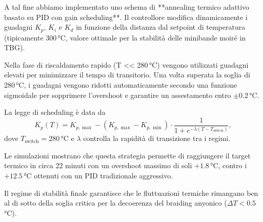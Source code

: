 \documentclass[11pt,a4paper]{article}
\theoremstyle{plain}
\theoremstyle{definition}
\begin{document}
\vspace{0.3cm}

A tal fine abbiamo implementato uno schema di **annealing termico adattivo basato su PID con gain scheduling**. Il controllore modifica dinamicamente i guadagni $K_p$, $K_i$ e $K_d$ in funzione della distanza dal setpoint di temperatura (tipicamente 300\,°C, valore ottimale per la stabilità delle minibande moiré in TBG). 

\vspace{0.3cm}

Nella fase di riscaldamento rapido (T << 280\,°C) vengono utilizzati guadagni elevati per minimizzare il tempo di transitorio. Una volta superata la soglia di 280\,°C, i guadagni vengono ridotti automaticamente secondo una funzione sigmoidale per sopprimere l'overshoot e garantire un assestamento entro $\pm 0.2$\,°C. 

\vspace{0.2cm}


La legge di scheduling è data da
\begin{equation}
K_p(T) = K_{p,\max} - (K_{p,\max} - K_{p,\min}) \cdot \frac{1}{1 + e^{-\lambda (T - T_{\text{switch}})}},
\label{eq:gain_scheduling}
\end{equation}
dove $T_{\text{switch}} = 280$\,°C e $\lambda$ controlla la rapidità di transizione tra i regimi.



\vspace{0.4cm}

Le simulazioni mostrano che questa strategia permette di raggiungere il target termico in circa 22 minuti con un overshoot massimo di soli $+1.8$\,°C, contro i $+12.5$\,°C ottenuti con un PID tradizionale aggressivo. 



\vspace{0.3cm}

Il regime di stabilità finale garantisce che le fluttuazioni termiche rimangano ben al di sotto della soglia critica per la decoerenza del braiding anyonico ($\Delta T < 0.5$\,°C).
\end{document}
